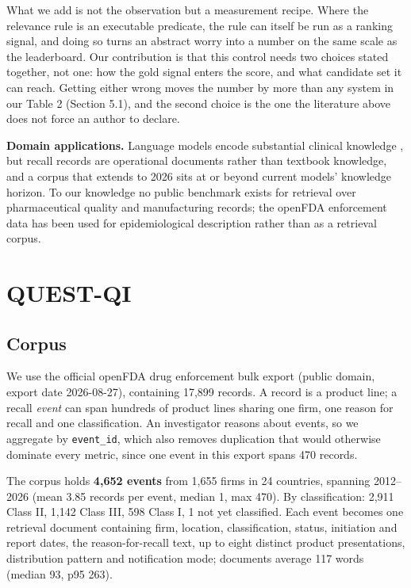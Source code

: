 \documentclass[runningheads]{llncs}
\begin{document}
What we add is not the observation but a measurement recipe. Where the relevance rule is an executable predicate, the rule can itself be run as a ranking signal, and doing so turns an abstract worry into a number on the same scale as the leaderboard. Our contribution is that this control needs two choices stated together, not one: how the gold signal enters the score, and what candidate set it can reach. Getting either wrong moves the number by more than any system in our Table 2 (Section 5.1), and the second choice is the one the literature above does not force an author to declare.

\textbf{Domain applications.} Language models encode substantial clinical knowledge \cite{singhal2022clinicalknowledge}, but recall records are operational documents rather than textbook knowledge, and a corpus that extends to 2026 sits at or beyond current models' knowledge horizon. To our knowledge no public benchmark exists for retrieval over pharmaceutical quality and manufacturing records; the openFDA enforcement data \cite{openfda_enforcement} has been used for epidemiological description rather than as a retrieval corpus.


\section{QUEST-QI}

\subsection{Corpus}
We use the official openFDA drug enforcement bulk export (public domain, export date 2026-08-27), containing 17,899 records. A record is a product line; a recall \textit{event} can span hundreds of product lines sharing one firm, one reason for recall and one classification. An investigator reasons about events, so we aggregate by \texttt{event\_id}, which also removes duplication that would otherwise dominate every metric, since one event in this export spans 470 records.

The corpus holds \textbf{4,652 events} from 1,655 firms in 24 countries, spanning 2012--2026 (mean 3.85 records per event, median 1, max 470). By classification: 2,911 Class II, 1,142 Class III, 598 Class I, 1 not yet classified. Each event becomes one retrieval document containing firm, location, classification, status, initiation and report dates, the reason-for-recall text, up to eight distinct product presentations, distribution pattern and notification mode; documents average 117 words (median 93, p95 263).
\end{document}
